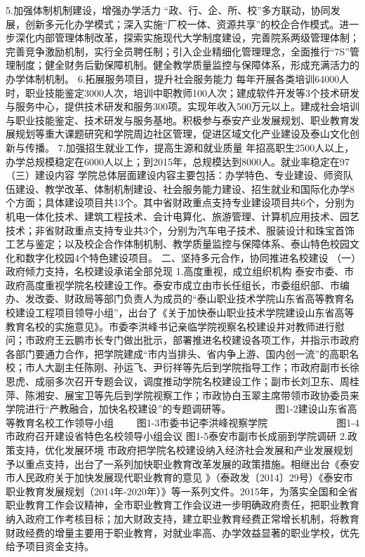 5.加强体制机制建设，增强办学活力
“政、行、企、所、校”多方联动，协同发展，创新多元化办学模式；深入实施“厂校一体、资源共享”的校企合作模式。进一步深化内部管理体制改革，探索实施现代大学制度建设，完善院系两级管理体制；完善竞争激励机制，实行全员聘任制；引入企业精细化管理理念，全面推行“7S”管理制度；健全财务后勤保障机制。健全教学质量监控与保障体系，形成充满活力的办学体制机制。
6.拓展服务项目，提升社会服务能力
每年开展各类培训64000人时，职业技能鉴定3000人次，培训中职教师100人次；建成软件开发等3个技术研发与服务中心，提供技术研发和服务300项。实现年收入500万元以上。建成社会培训与职业技能鉴定、技术研发与服务基地。积极参与泰安产业发展规划、职业教育发展规划等重大课题研究和学院周边社区管理，促进区域文化产业建设及泰山文化创新与传播。
7.加强招生就业工作，提高生源和就业质量
年招高职生2500人以上，办学总规模稳定在6000人以上；到2015年，总规模达到8000人。就业率稳定在97%
（三）建设内容
学院总体层面建设内容主要包括：办学特色、专业建设、师资队伍建设、教学改革、体制机制建设、社会服务能力建设、招生就业和国际化办学8个方面；具体建设项目共13个。其中省财政重点支持专业建设项目共6个，分别为机电一体化技术、建筑工程技术、会计电算化、旅游管理、计算机应用技术、园艺技术；非省财政重点支持专业共3个，分别为汽车电子技术、服装设计和珠宝首饰工艺与鉴定；以及校企合作体制机制、教学质量监控与保障体系、泰山特色校园文化和数字化校园4个特色建设项目。
二、坚持多元合作，协同推进名校建设
（一）政府倾力支持，名校建设承诺全部兑现
1.高度重视，成立组织机构
泰安市委、市政府高度重视学院名校建设工作。泰安市成立由市长任组长，市委组织部、市编办、发改委、财政局等部门负责人为成员的“泰山职业技术学院山东省高等教育名校建设工程项目领导小组”，出台了《关于加快泰山职业技术学院建设山东省高等教育名校的实施意见》。市委李洪峰书记亲临学院视察名校建设并对教师进行慰问；市政府王云鹏市长专门做出批示，部署推进名校建设各项工作，并指示市政府各部门要通力合作，把学院建成“市内当排头、省内争上游、国内创一流”的高职名校；市人大副主任陈刚、孙运飞、尹衍祥等先后到学院指导工作；市政府副市长徐恩虎、成丽多次召开专题会议，调度推动学院名校建设工作；副市长刘卫东、周桂萍、陈湘安、展宝卫等先后到学院视察工作；市政协白玉翠主席带领市政协委员来学院进行“产教融合，加快名校建设”的专题调研等。　
　      　　
图1-2建设山东省高等教育名校工作领导小组　  　图1-3市委书记李洪峰视察学院
　　　　 
　　
图1-4市政府召开建设省特色名校领导小组会议  图1-5泰安市副市长成丽到学院调研
2.政策支持，优化发展环境
市政府把学院名校建设纳入经济社会发展和产业发展规划予以重点支持，出台了一系列加快职业教育改革发展的政策措施。相继出台《泰安市人民政府关于加快发展现代职业教育的意见 》（泰政发〔2014〕29号）《泰安市职业教育发展规划（2014年-2020年）》等一系列文件。2015年，为落实全国和全省职业教育工作会议精神，全市职业教育工作会议进一步明确政府责任，把职业教育纳入政府工作考核目标；加大财政支持，建立职业教育经费正常增长机制，将教育财政经费的增量主要用于职业教育，对就业率高、办学效益显著的职业学校，优先给予项目资金支持。
